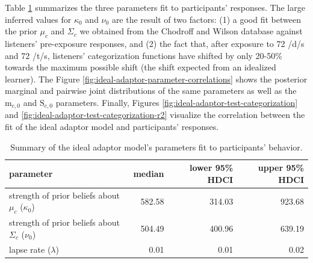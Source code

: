 \documentclass[
  11pt,
  man,mask,floatsintext]{apa6}
\begin{document}
Table \ref{tab:ideal-adaptor-parameter-summary} summarizes the three parameters fit to participants' responses. The large inferred values for \(\kappa_{0}\) and \(\nu_{0}\) are the result of two factors: (1) a good fit between the prior \(\mu_{c}\) and \(\Sigma_c\) we obtained from the Chodroff and Wilson database against listeners' pre-exposure responses, and (2) the fact that, after exposure to 72 /d/s and 72 /t/s, listeners' categorization functions have shifted by only 20-50\% towards the maximum possible shift (the shift expected from an idealized learner). The Figure \ref{fig:ideal-adaptor-parameter-correlations} shows the posterior marginal and pairwise joint distributions of the same parameters as well as the \(\mathrm{m}_{c,0}\) and \(\mathrm{S}_{c,0}\) parameters. Finally, Figures \ref{fig:ideal-adaptor-test-categorization} and \ref{fig:ideal-adaptor-test-categorization-r2} visualize the correlation between the fit of the ideal adaptor model and participants' responses.

\begin{table}

\caption{\label{tab:ideal-adaptor-parameter-summary}Summary of the ideal adaptor model's parameters fit to participants' behavior.}
\centering
\begin{tabular}[t]{l|r|r|r}
\hline
parameter & median & lower 95\% HDCI & upper 95\% HDCI\\
\hline
strength of prior beliefs about $\mu_c$ ($\kappa_{0}$) & 582.58 & 314.03 & 923.68\\
\hline
strength of prior beliefs about $\Sigma_c$ ($\nu_{0}$) & 504.49 & 400.96 & 639.19\\
\hline
lapse rate ($\lambda$) & 0.01 & 0.01 & 0.02\\
\hline
\end{tabular}
\end{table}
\end{document}

